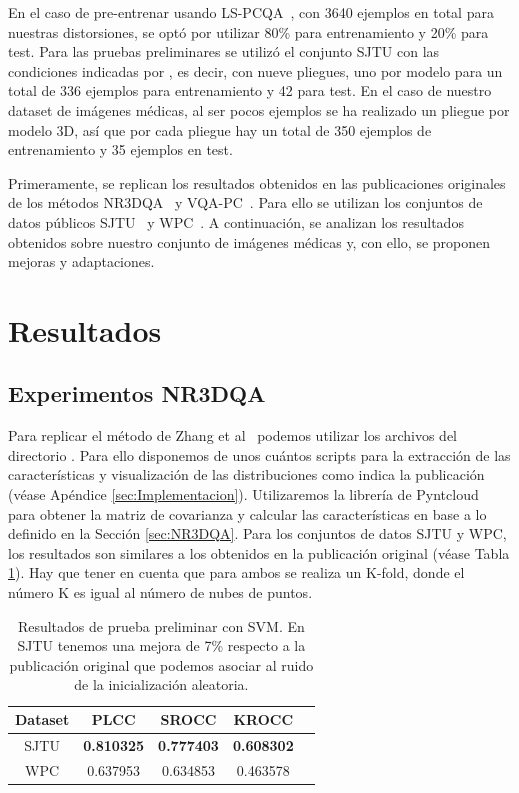 En el caso de pre-entrenar usando LS-PCQA~\cite{ResSCNN}, con 3640 ejemplos en total para 
nuestras distorsiones, se optó por utilizar 80\% para entrenamiento y 20\% para test. 
Para las pruebas preliminares se utilizó el conjunto SJTU con las condiciones indicadas por 
\cite{VQA-PC}, es decir, con nueve pliegues, uno por modelo para un total de 336 ejemplos para entrenamiento y 42 para test. 
En el caso de nuestro dataset de imágenes médicas, al ser pocos ejemplos 
se ha realizado un pliegue por modelo 3D, así que por cada pliegue hay un total de 
350 ejemplos de entrenamiento y 35 ejemplos en test. 

Primeramente, se replican los resultados obtenidos en las publicaciones originales 
de los métodos NR3DQA~\cite{NR3DQA} y VQA-PC~\cite{VQA-PC}. Para ello se utilizan
los conjuntos de datos públicos SJTU~\cite{SJTU} y WPC~\cite{WPC1,WPC2}. 
A continuación, se analizan los resultados obtenidos sobre nuestro conjunto 
de imágenes médicas y, con ello, se proponen mejoras y adaptaciones.

\section{Resultados}
\subsection{Experimentos NR3DQA}
Para replicar el método de Zhang et al~\cite{NR3DQA} podemos utilizar los 
archivos del directorio . Para ello disponemos de unos cuántos scripts para la extracción de las características y visualización de las distribuciones 
como indica la publicación (véase Apéndice \ref{sec:Implementacion}). 
Utilizaremos la librería de Pyntcloud~\cite{Pyntcloud} para obtener 
la matriz de covarianza y calcular las características en base a lo definido 
en la Sección \ref{sec:NR3DQA}.
Para los conjuntos de datos SJTU y WPC, los resultados 
son similares a los obtenidos en la publicación original (véase Tabla \ref{tab:PlainNR3DQA}).
Hay que tener en cuenta que para ambos se realiza un K-fold, donde el número 
K es igual al número de nubes de puntos.

\begin{table}[htp]
  \scriptsize
  \begin{center}
    \begin{tabular}[c]{|c|c|c|c|c|}
      \hline
      \rowcolor[HTML]{FFC702}
      \textbf{Dataset} & \textbf{PLCC} & \textbf{SROCC} & \textbf{KROCC} \\ 
      \hline
      SJTU & \textbf{0.810325} & \textbf{0.777403} & \textbf{0.608302} \\ 
      \hline 
      WPC & 0.637953 & 0.634853 & 0.463578 \\
      \hline
    \end{tabular}
  \end{center}
  \caption[Resultados de prueba preliminar con SVM.]{Resultados de prueba preliminar con SVM.
  En SJTU tenemos una mejora de 7\% respecto a la publicación original que podemos asociar al ruido de la inicialización aleatoria. }
  \label{tab:PlainNR3DQA}
\end{table}

